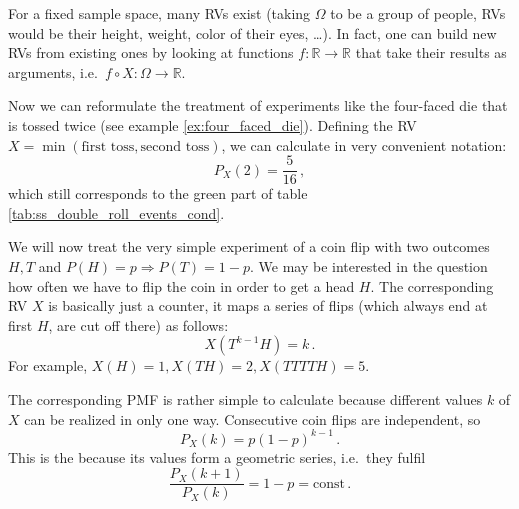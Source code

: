 

For a fixed sample space, many RVs exist (taking $\Omega$ to be a group of people, RVs would be their height, weight, color of their eyes, \dots). In fact, one can build new RVs from existing ones by looking at functions $f: \mathbb{R} \rightarrow \mathbb{R}$ that take their results as arguments, i.e.~$f \circ X: \Omega \rightarrow \mathbb{R}$.


\begin{ex}
Now we can reformulate the treatment of experiments like the four-faced die that is tossed twice (see example \ref{ex:four_faced_die}). Defining the RV $X = \min(\text{first toss}, \text{second toss})$, we can calculate in very convenient notation:
\begin{equation*}
P_X(2) = \frac{5}{16} \, ,
\end{equation*}
which still corresponds to the green part of table \ref{tab:ss_double_roll_events_cond}.
\end{ex}


\begin{ex}\label{ex:coin_flip_rvs}
We will now treat the very simple experiment of a coin flip with two outcomes $H, T$ and $P(H) = p \Rightarrow P(T) = 1 - p$. We may be interested in the question how often we have to flip the coin in order to get a head $H$. The corresponding RV $X$ is basically just a counter, it maps a series of flips (which always end at first $H$, are cut off there) as follows:
\begin{equation*}
X(T^{k - 1} H) = k \, .
\end{equation*}
For example, $X(H) = 1, X(TH) = 2, X(TTTTH) = 5$.

The corresponding PMF is rather simple to calculate because different values $k$ of $X$ can be realized in only one way. Consecutive coin flips are independent, so
\begin{equation*}
P_X(k) = p (1 - p)^{k - 1} \, .
\end{equation*}
This is the  because its values form a geometric series, i.e.~they fulfil
\begin{equation*}
\frac{P_X(k + 1)}{P_X(k)} = 1 - p = \text{const} \, .
\end{equation*}
\end{ex}


